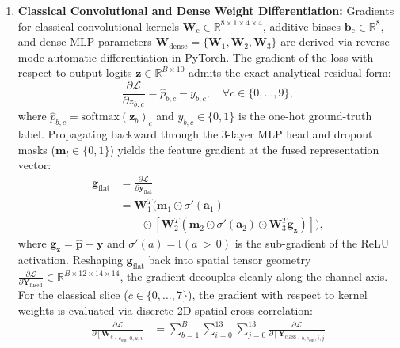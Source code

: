 \documentclass[pdflatex,sn-mathphys-num]{sn-jnl}%
\theoremstyle{thmstyleone}%
\theoremstyle{thmstyletwo}%
\theoremstyle{thmstylethree}%
\begin{document}
\begin{enumerate}
    \item \textbf{Classical Convolutional and Dense Weight Differentiation:} Gradients for classical convolutional kernels $\mathbf{W}_{\mathrm{c}} \in \mathbb{R}^{8 \times 1 \times 4 \times 4}$, additive biases $\mathbf{b}_{\mathrm{c}} \in \mathbb{R}^8$, and dense MLP parameters $\mathbf{W}_{\mathrm{dense}} = \{\mathbf{W}_1, \mathbf{W}_2, \mathbf{W}_3\}$ are derived via reverse-mode automatic differentiation in PyTorch. The gradient of the loss with respect to output logits $\mathbf{z} \in \mathbb{R}^{B \times 10}$ admits the exact analytical residual form:
    \begin{equation}
    \frac{\partial \mathcal{L}}{\partial z_{b, c}} = \hat{p}_{b, c} - y_{b, c}, \quad \forall c \in \{0, \dots, 9\},
    \label{eq:logit_residual_gradient}
    \end{equation}
    where $\hat{p}_{b, c} = \mathrm{softmax}(\mathbf{z}_b)_c$ and $y_{b, c} \in \{0, 1\}$ is the one-hot ground-truth label. Propagating backward through the 3-layer MLP head and dropout masks ($\mathbf{m}_l \in \{0, 1\}$) yields the feature gradient at the fused representation vector:
    \begin{align}
    \mathbf{g}_{\mathrm{flat}} &= \frac{\partial \mathcal{L}}{\partial \mathbf{y}_{\mathrm{flat}}} \nonumber \\
    &= \mathbf{W}_1^T \Big( \mathbf{m}_1 \odot \sigma'(\mathbf{a}_1) \nonumber \\
    &\qquad \odot \left[ \mathbf{W}_2^T \left( \mathbf{m}_2 \odot \sigma'(\mathbf{a}_2) \odot \mathbf{W}_3^T \mathbf{g}_{\mathbf{z}} \right) \right] \Big),
    \label{eq:dense_head_backprop}
    \end{align}
    where $\mathbf{g}_{\mathbf{z}} = \hat{\mathbf{p}} - \mathbf{y}$ and $\sigma'(a) = \mathbb{I}(a \,{>}\, 0)$ is the sub-gradient of the ReLU activation. Reshaping $\mathbf{g}_{\mathrm{flat}}$ back into spatial tensor geometry $\frac{\partial \mathcal{L}}{\partial \mathbf{Y}_{\mathrm{fused}}} \in \mathbb{R}^{B \times 12 \times 14 \times 14}$, the gradient decouples cleanly along the channel axis. For the classical slice ($c \in \{0, \dots, 7\}$), the gradient with respect to kernel weights is evaluated via discrete 2D spatial cross-correlation:
    \begin{align}
    \frac{\partial \mathcal{L}}{\partial [\mathbf{W}_{\mathrm{c}}]_{c_{\mathrm{out}}, 0, u, v}} &= \sum_{b=1}^B \sum_{i=0}^{13} \sum_{j=0}^{13} \frac{\partial \mathcal{L}}{\partial [\mathbf{Y}_{\mathrm{class}}]_{b, c_{\mathrm{out}}, i, j}} \nonumber \\

\end{align}
\end{enumerate}
\end{document}
